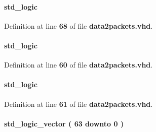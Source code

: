 \paragraph[{reg\+\_\+1\+\_\+en}]{ {\bfseries \textcolor{comment}{std\+\_\+logic}\textcolor{vhdlchar}{ }} \hspace{0.3cm}{\ttfamily [Signal]}}\label{classdata2packets_1_1arch_a9505b8f368f950bae2c083f260666d45}


Definition at line {\bf 68} of file {\bf data2packets.\+vhd}.

\paragraph[{reg\+\_\+1\+\_\+ld}]{ {\bfseries \textcolor{comment}{std\+\_\+logic}\textcolor{vhdlchar}{ }} \hspace{0.3cm}{\ttfamily [Signal]}}\label{classdata2packets_1_1arch_adc60f070216586ca2a08bc3ce5e564cb}


Definition at line {\bf 60} of file {\bf data2packets.\+vhd}.

\paragraph[{reg\+\_\+1\+\_\+ld\+\_\+f}]{ {\bfseries \textcolor{comment}{std\+\_\+logic}\textcolor{vhdlchar}{ }} \hspace{0.3cm}{\ttfamily [Signal]}}\label{classdata2packets_1_1arch_a0ed1755762d4ff7c81c93e1f4e47f658}


Definition at line {\bf 61} of file {\bf data2packets.\+vhd}.

\paragraph[{reg\+\_\+2}]{ {\bfseries \textcolor{comment}{std\+\_\+logic\+\_\+vector}\textcolor{vhdlchar}{ }\textcolor{vhdlchar}{(}\textcolor{vhdlchar}{ }\textcolor{vhdlchar}{ } \textcolor{vhdldigit}{63} \textcolor{vhdlchar}{ }\textcolor{keywordflow}{downto}\textcolor{vhdlchar}{ }\textcolor{vhdlchar}{ } \textcolor{vhdldigit}{0} \textcolor{vhdlchar}{ }\textcolor{vhdlchar}{)}\textcolor{vhdlchar}{ }} \hspace{0.3cm}{\ttfamily [Signal]}}\label{classdata2packets_1_1arch_a1552c71bcf94c0ddc78751a2c813a2ca}


